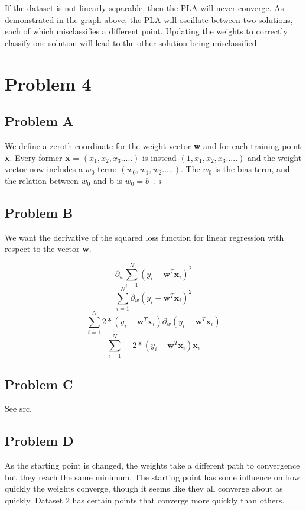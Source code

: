 \documentclass[12pt]{article} %
\begin{document}
If the dataset is not linearly separable, then the PLA will never converge. As demonstrated in the graph above, the PLA will oscillate between two solutions, each of which misclassifies a different point. Updating the weights to correctly classify one solution will lead to the other solution being misclassified.

\section{Problem 4}
\subsection{Problem A}
We define a zeroth coordinate for the weight vector \textbf{w} and for each training point \textbf{x}. Every former \textbf{x} = $(x_1, x_2, x_3.....)$ is instead $(1, x_1, x_2, x_3.....)$ and the weight vector now includes a $w_0$ term: $(w_0, w_1, w_2.....)$. The $w_0$ is the bias term, and the relation between $w_0$ and b is $w_0 = b \div i$

\subsection{Problem B}
We want the derivative of the squared loss function for linear regression with respect to the vector \textbf{w}.

$$\partial _w \sum_{i = 1}^{N} (y_i - \textbf{w}^T\textbf{x}_i)^2$$
$$\sum_{i = 1}^{N} \partial _w (y_i - \textbf{w}^T\textbf{x}_i)^2$$
$$\sum_{i = 1}^{N} 2 * (y_i - \textbf{w}^T\textbf{x}_i) \partial _w (y_i - \textbf{w}^T\textbf{x}_i)$$
$$\sum_{i = 1}^{N} -2 * (y_i - \textbf{w}^T\textbf{x}_i) \textbf{x}_i$$

\subsection{Problem C}
See src.



\subsection{Problem D}
As the starting point is changed, the weights take a different path to convergence but they reach the same minimum. The starting point has some influence on how quickly the weights converge, though it seems like they all converge about as quickly. Dataset 2 has certain points that converge more quickly than others.
\end{document}
